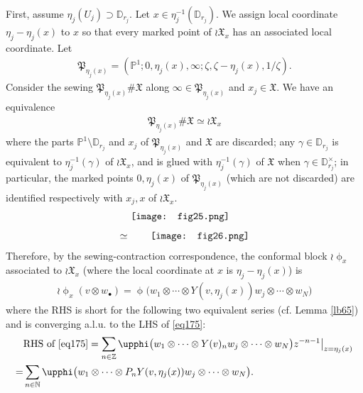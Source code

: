 \documentclass[11pt,b5paper,notitlepage]{article}
\theoremstyle{definition}
\theoremstyle{plain}
\newcommand{\fk}{\mathfrak}
\newcommand{\blt}{\bullet}
\newcommand{\Nbb}{\mathbb N}
\newcommand{\Zbb}{\mathbb Z}
\newcommand{\Pbb}{\mathbb P}
\newcommand{\Dbb}{\mathbb D}
\numberwithin{equation}{section}
\begin{document}
First, assume  $\eta_j(U_j)\supset\Dbb_{r_j}$.  Let $x\in\eta_j^{-1}(\Dbb_{r_j})$. We assign local coordinate $\eta_j-\eta_j(x)$ to $x$ so that every marked point of $\wr\fk X_x$ has an associated local coordinate. Let 
\begin{align}
	\fk P_{\eta_j(x)}=(\Pbb^1;0,\eta_j(x),\infty;\zeta,\zeta-\eta_j(x),1/\zeta).	
\end{align}
Consider the sewing $\fk P_{\eta_j(x)}\#\fk X$ along $\infty\in\fk P_{\eta_j(x)}$ and $x_j\in\fk X$.  We have an equivalence
\begin{align}
	\fk P_{\eta_j(x)}\#\fk X \simeq \wr\fk X_x	
\end{align}
where the parts $\Pbb^1\setminus\Dbb_{r_j}$ and $x_j$ of $\fk P_{\eta_j(x)}$ and $\fk X$ are discarded; any $\gamma\in\Dbb_{r_j}$ is equivalent to $\eta_j^{-1}(\gamma)$ of $\wr\fk X_x$, and is glued with $\eta_j^{-1}(\gamma)$ of $\fk X$ when $\gamma\in\Dbb_{r_j}^\times$; in particular, the marked points $0,\eta_j(x)$ of $\fk P_{\eta_j(x)}$ (which are not discarded) are identified respectively with $x_j,x$ of $\wr\fk X_x$. 
\begin{align}
	\begin{aligned}
		&\vcenter{\hbox{{
					\texttt{[image: fig25.png]}}}}\\[1ex]
		\simeq&\qquad\vcenter{\hbox{{
					\texttt{[image: fig26.png]}}}}
	\end{aligned}	
\end{align}
Therefore, by the sewing-contraction correspondence, the conformal block $\wr\upphi_x$ associated to $\wr\fk X_x$ (where the local coordinate at $x$ is $\eta_j-\eta_j(x)$) is
\begin{align}
	\wr\upphi_x(v\otimes w_\blt)=\upphi\big(w_1\otimes\cdots \otimes Y(v,\eta_j(x))w_j\otimes\cdots \otimes w_N\big)	\label{eq175}
\end{align}
where the RHS is short for the following two equivalent series (cf. Lemma \ref{lb65}) and is converging a.l.u. to the LHS of \eqref{eq175}:
\begin{align}\label{eq191}
\begin{aligned}
&\text{RHS of }\eqref{eq175}=\sum_{n\in\Zbb}\upphi\big(w_1\otimes\cdots \otimes Y(v)_nw_j\otimes\cdots \otimes w_N\big)z^{-n-1}\big|_{z=\eta_j(x)}\\
=&\sum_{n\in\Nbb}\upphi\big(w_1\otimes\cdots \otimes P_nY(v,\eta_j(x))w_j\otimes\cdots \otimes w_N\big).
\end{aligned}	
\end{align}
\end{document}
